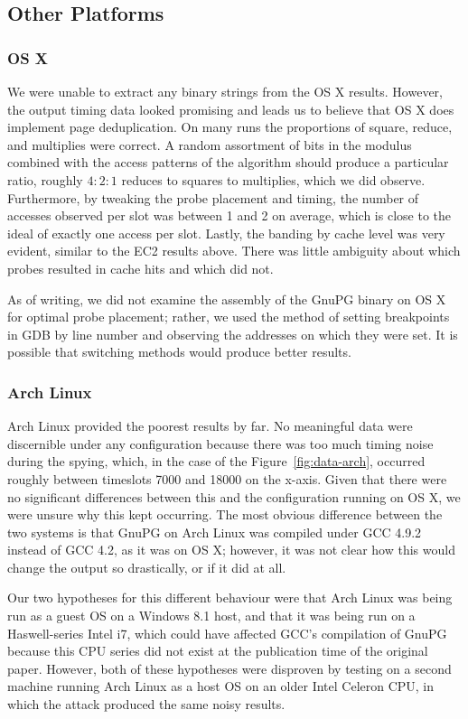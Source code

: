 \documentclass[11pt]{llncs}
\begin{document}
\subsection{Other Platforms}

\subsubsection{OS X}

We were unable to extract any binary strings from the OS X results. However,
the output timing data looked promising and leads us to believe that OS X does
implement page deduplication. On many runs the
proportions of square, reduce, and multiplies were correct. A random assortment
of bits in the modulus combined with the access patterns of the algorithm should
produce a particular ratio, roughly $4:2:1$ reduces to squares to multiplies,
which we did observe. Furthermore, by tweaking the probe placement and
timing, the number of accesses observed per slot was between 1 and 2 on average,
which is close to the ideal of exactly one access per slot. Lastly, the banding
by cache level was very evident, similar to the EC2 results above. There was
little ambiguity about which probes resulted in cache hits and which did not.

As of writing, we did not examine the assembly of the GnuPG binary on OS X for
optimal probe placement; rather, we used the method of setting breakpoints in GDB by line
number and observing the addresses on which they were set. It is possible that
switching methods would produce better results.

\subsubsection{Arch Linux}

Arch Linux provided the poorest results by far. No meaningful data were
discernible under any configuration because there was too much timing noise
during the spying, which, in the case of the Figure~\ref{fig:data-arch}, occurred roughly
between timeslots 7000 and 18000 on the x-axis. Given that there were no
significant differences between this and the configuration running on OS X, we
were unsure why this kept occurring. The most obvious
difference between the two systems is that GnuPG on Arch Linux was compiled
under GCC 4.9.2 instead of GCC 4.2, as it was on OS X; however, it was not clear how
this would change the output so drastically, or if it did at all.

Our two hypotheses for this different behaviour were that Arch Linux
was being run as a guest OS on a Windows 8.1 host, and that it was being run on
a Haswell-series Intel i7, which could have affected GCC's compilation of GnuPG
because this CPU series
did not exist at the publication time of the original paper.  However, both of
these hypotheses were disproven by testing on a second machine running Arch
Linux as a host OS on an older Intel Celeron CPU, in which the attack produced
the same noisy results.
\end{document}

